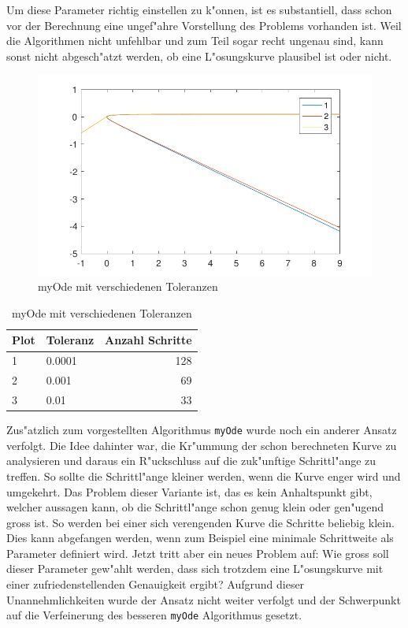 \begin{refsection}
Um diese Parameter richtig einstellen zu k"onnen, ist es substantiell, dass schon vor der Berechnung eine ungef"ahre Vorstellung des Problems vorhanden ist.
Weil die Algorithmen nicht unfehlbar und zum Teil sogar recht ungenau sind, kann sonst nicht abgesch"atzt werden, ob eine L"osungskurve plausibel ist oder nicht.
\begin{figure}
\centering
\includegraphics{schrittlaenge/images/myOdeToleranz.pdf}
\caption{myOde mit verschiedenen Toleranzen}
\label{image:myOdeToleranz}
\end{figure}
\begin{table}
\centering
\begin{tabular}{|l|l|r|}
\hline
Plot & Toleranz & Anzahl Schritte\\ \hline
1 & 0.0001 & 128\\
2 & 0.001 & 69\\
3 & 0.01 & 33\\
\hline
\end{tabular}
\caption{myOde mit verschiedenen Toleranzen}
\label{table:myOdeToleranz}
\end{table}

Zus"atzlich zum vorgestellten Algorithmus \texttt{myOde} wurde noch ein anderer Ansatz verfolgt.
Die Idee dahinter war, die Kr"ummung der schon berechneten Kurve zu analysieren und daraus ein R"uckschluss auf die zuk"unftige Schrittl"ange zu treffen.
So sollte die Schrittl"ange kleiner werden, wenn die Kurve enger wird und umgekehrt.
Das Problem dieser Variante ist, das es kein Anhaltspunkt gibt, welcher aussagen kann, ob die Schrittl"ange schon genug klein oder gen"ugend gross ist.
So werden bei einer sich verengenden Kurve die Schritte beliebig klein. Dies kann abgefangen werden, wenn zum Beispiel eine minimale Schrittweite als Parameter definiert wird.
Jetzt tritt aber ein neues Problem auf: Wie gross soll dieser Parameter gew"ahlt werden, dass sich trotzdem eine L"osungskurve mit einer zufriedenstellenden Genauigkeit ergibt?
Aufgrund dieser Unannehmlichkeiten wurde der Ansatz nicht weiter verfolgt und der Schwerpunkt auf die Verfeinerung des besseren \texttt{myOde} Algorithmus gesetzt.  

\end{refsection}

